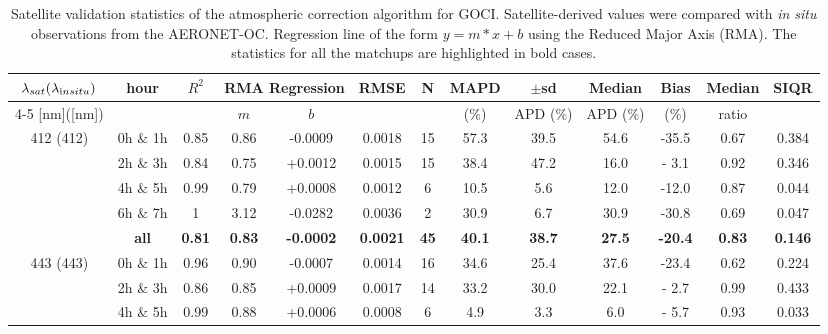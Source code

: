 \documentclass[onecolumn,3p,letterpaper,11pt]{elsarticle}
\begin{document}
\begin{table}[htbp!]
\caption{Satellite validation statistics of the atmospheric correction algorithm for GOCI. Satellite-derived values were compared with {\it in situ} observations from the AERONET-OC. Regression line of the form $y=m*x+b$ using the Reduced Major Axis (RMA). The statistics for all the matchups are highlighted in bold cases. \label{tab:val_stats} }
\tiny
\centering
\begin{tabular}{ccccccccccccc} 
 \hline 
$\lambda_{sat} (\lambda_{\text in situ})$ & hour & $R^2$ & \multicolumn{2}{c}{RMA Regression} & RMSE & N & MAPD & $\pm$sd & Median & Bias & Median & SIQR \\ \cline{4-5}
[nm]([nm])                  &              &         & $m$     & $b$     &             &     & ($\%$)  & APD ($\%$)  & APD ($\%$)  & ($\%$)   & ratio   &         \\ \hline 
\multirow{5}{*}{412 (412)}  &  0h $\&$ 1h  & 0.85    & 0.86    & -0.0009 & 0.0018      & 15  & 57.3    & 39.5        & 54.6        & -35.5    & 0.67    & 0.384   \\ 
                            &  2h $\&$ 3h  & 0.84    & 0.75    & +0.0012 & 0.0015      & 15  & 38.4    & 47.2        & 16.0        & - 3.1    & 0.92    & 0.346   \\ 
                            &  4h $\&$ 5h  & 0.99    & 0.79    & +0.0008 & 0.0012      & 6   & 10.5    &  5.6        & 12.0        & -12.0    & 0.87    & 0.044   \\ 
                            &  6h $\&$ 7h  & 1       & 3.12    & -0.0282 & 0.0036      & 2   & 30.9    &  6.7        & 30.9        & -30.8    & 0.69    & 0.047   \\ 
                              &  \textbf{all}         & \textbf{0.81}    & \textbf{0.83}    & \textbf{-0.0002} & \textbf{0.0021}      & \textbf{45}  & \textbf{40.1}    & \textbf{38.7}        & \textbf{27.5}        & \textbf{-20.4}    & \textbf{0.83}    & \textbf{0.146}   \\ \hline 
\multirow{5}{*}{443 (443)}  &  0h $\&$ 1h  & 0.96    & 0.90    & -0.0007 & 0.0014      & 16  & 34.6    & 25.4        & 37.6        & -23.4    & 0.62    & 0.224   \\ 
                            &  2h $\&$ 3h  & 0.86    & 0.85    & +0.0009 & 0.0017      & 14  & 33.2    & 30.0        & 22.1        & - 2.7    & 0.99    & 0.433   \\ 
                            &  4h $\&$ 5h  & 0.99    & 0.88    & +0.0006 & 0.0008      & 6   &  4.9    &  3.3        &  6.0        & - 5.7    & 0.93    & 0.033   \\ 

\end{tabular}
\end{table}
\end{document}
